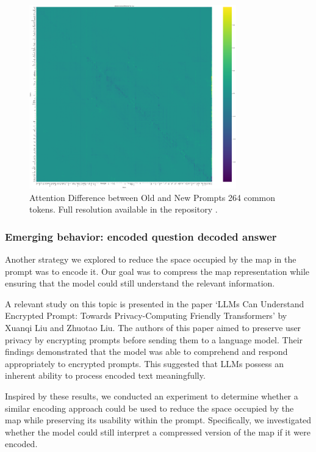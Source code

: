 \begin{figure}[ht!]
  \centering
  \includegraphics[width=0.8\textwidth]{images/data_collection/difference.png}
  \caption{Attention Difference between Old and New Prompts 264 common tokens. Full
  resolution available in the repository \cite{projectrepo}.}
  \label{fig:difference}
\end{figure}

\subsubsection{Emerging behavior: encoded question decoded answer}

Another strategy we explored to reduce the space occupied by the map in the prompt
was to encode it. Our goal was to compress the map representation while ensuring
that the model could still understand the relevant information.

A relevant study on this topic is presented in the paper `LLMs Can Understand Encrypted
Prompt: Towards Privacy-Computing Friendly Transformers' by Xuanqi Liu and Zhuotao
Liu\cite{liu2023llmsunderstandencryptedprompt}. The authors of this paper aimed to
preserve user privacy by encrypting prompts before sending them to a language model.
Their findings demonstrated that the model was able to comprehend and respond
appropriately to encrypted prompts. This suggested that LLMs possess an inherent
ability to process encoded text meaningfully.

Inspired by these results, we conducted an experiment to determine whether a
similar encoding approach could be used to reduce the space occupied by the map
while preserving its usability within the prompt. Specifically, we investigated
whether the model could still interpret a compressed version of the map if it
were encoded.

